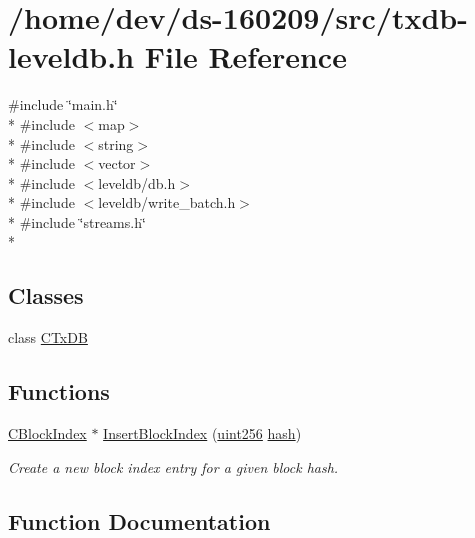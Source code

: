 \hypertarget{txdb-leveldb_8h}{}\section{/home/dev/ds-\/160209/src/txdb-\/leveldb.h File Reference}
\label{txdb-leveldb_8h}
{\ttfamily \#include \char`\"{}main.\+h\char`\"{}}\\*
{\ttfamily \#include $<$map$>$}\\*
{\ttfamily \#include $<$string$>$}\\*
{\ttfamily \#include $<$vector$>$}\\*
{\ttfamily \#include $<$leveldb/db.\+h$>$}\\*
{\ttfamily \#include $<$leveldb/write\+\_\+batch.\+h$>$}\\*
{\ttfamily \#include \char`\"{}streams.\+h\char`\"{}}\\*
\subsection*{Classes}
\begin{DoxyCompactItemize}
\item 
class \hyperlink{class_c_tx_d_b}{C\+Tx\+D\+B}
\end{DoxyCompactItemize}
\subsection*{Functions}
\begin{DoxyCompactItemize}
\item 
\hyperlink{class_c_block_index}{C\+Block\+Index} $\ast$ \hyperlink{txdb-leveldb_8h_af3adfd64a90ee443bfa5fe16321aa2d7}{Insert\+Block\+Index} (\hyperlink{classuint256}{uint256} \hyperlink{cache_8cc_a11ecb029164e055f28f4123ce3748862}{hash})
\begin{DoxyCompactList}\small\item\em Create a new block index entry for a given block hash. \end{DoxyCompactList}\end{DoxyCompactItemize}


\subsection{Function Documentation}
\hypertarget{txdb-leveldb_8h_af3adfd64a90ee443bfa5fe16321aa2d7}{}
